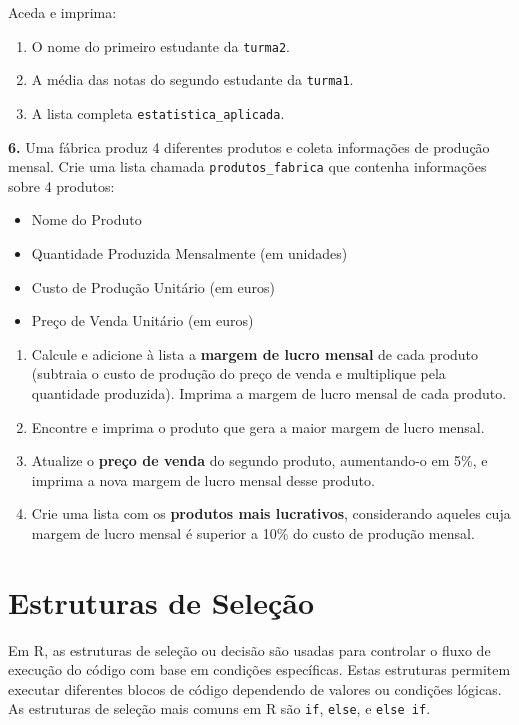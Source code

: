 \documentclass[
]{book}
\providecommand{\tightlist}{%
  \setlength{\itemsep}{0pt}\setlength{\parskip}{0pt}}
\begin{document}
Aceda e imprima:

\begin{enumerate}
\def\labelenumi{(\alph{enumi})}
\tightlist
\item
  O nome do primeiro estudante da \texttt{turma2}.
\item
  A média das notas do segundo estudante da \texttt{turma1}.
\item
  A lista completa \texttt{estatistica\_aplicada}.
\end{enumerate}

\textbf{6.} Uma fábrica produz 4 diferentes produtos e coleta informações de produção mensal. Crie uma lista chamada \texttt{produtos\_fabrica} que contenha informações sobre 4 produtos:

\begin{itemize}
\item
  Nome do Produto
\item
  Quantidade Produzida Mensalmente (em unidades)
\item
  Custo de Produção Unitário (em euros)
\item
  Preço de Venda Unitário (em euros)
\end{itemize}

\begin{enumerate}
\def\labelenumi{(\alph{enumi})}
\item
  Calcule e adicione à lista a \textbf{margem de lucro mensal} de cada produto (subtraia o custo de produção do preço de venda e multiplique pela quantidade produzida). Imprima a margem de lucro mensal de cada produto.
\item
  Encontre e imprima o produto que gera a maior margem de lucro mensal.
\item
  Atualize o \textbf{preço de venda} do segundo produto, aumentando-o em 5\%, e imprima a nova margem de lucro mensal desse produto.
\item
  Crie uma lista com os \textbf{produtos mais lucrativos}, considerando aqueles cuja margem de lucro mensal é superior a 10\% do custo de produção mensal.
\end{enumerate}

\chapter{Estruturas de Seleção}\label{estruturas-de-seleuxe7uxe3o}

Em R, as estruturas de seleção ou decisão são usadas para controlar o
fluxo de execução do código com base em condições específicas. Estas
estruturas permitem executar diferentes blocos de código dependendo de
valores ou condições lógicas. As estruturas de seleção mais comuns em R
são \texttt{if}, \texttt{else}, e \texttt{else\ if}.
\end{document}
